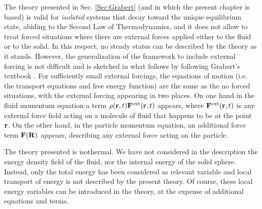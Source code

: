 \documentclass[b5paper,openright,10pt]{book}
\begin{document}
The theory presented in Sec.  \ref{Sec:Grabert} (and in which the present chapter is based) is valid for \textit{isolated}
systems that  decay toward the  unique equilibrium state,  abiding to
the  Second Law  of Thermodynamics,  and it  does not  allow to  treat
forced situations  where there are  external forces applied  either to
the fluid or to  the solid.  In this respect, no  steady states can be
described by the theory as  it stands.  However, the generalization of
the  framework to  include external  forcing is  not difficult  and is
sketched   in   what   follows   by   following   Grabert's   textbook
\cite{Grabert1982}.   For sufficiently  small  external forcings,  the
equations of  motion (i.e.   the transport  equations and  free energy
function) are the same as the  no forced situations, with the external
forcing appearing  in two places.  On  one hand in the  fluid momentum
equation a term $\rho({\bf r},t){\bf F}^{\rm ext}({\bf r},t)$ appears,
where  ${\bf F}^{\rm  ext}({\bf  r},t)$ is  any  external force  field
acting on a  molecule of fluid that  happens to be at  the point ${\bf
  r}$.  On the  other  hand,  in the  particle  momentum equation,  an
additional  force  term ${\bf  F}({\bf  R})$  appears, describing  any
external force acting on the particle.

The theory  presented is  isothermal.  We have  not considered  in the
description the  energy density field  of the fluid, nor  the internal
energy of the  solid sphere.  Instead, only the total  energy has been
considered as relevant  variable and local transport of  energy is not
described  by  the present  theory.   Of  course, these  local  energy
variables  can  be  introduced  in  the  theory,  at  the  expense  of
additional equations and terms.
\end{document}
